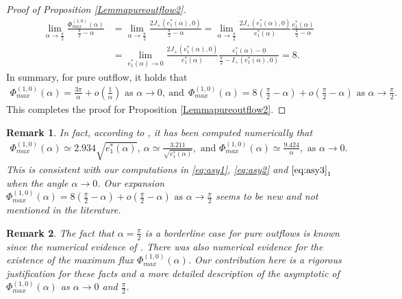 \documentclass[reqno,12pt]{amsart}
\newtheorem{remark}{Remark}[section]
\begin{document}
\begin{proof} [Proof of Proposition \ref{Lemmapureoutflow2}]
\begin{align*}
    \lim_{\alpha\to \frac{\pi}{2}} \frac{ \Phi_{max}^{(1, 0)}(\alpha)}{\frac{\pi}{2}-\alpha} &= \lim_{\alpha\to \frac{\pi}{2}}  \frac{2 J_{+}(e_1^*(\alpha), 0)}{\frac{\pi}{2}-\alpha} = \lim_{\alpha\to \frac{\pi}{2}}  \frac{2 J_{+}(e_1^*(\alpha),0)}{e_1^*(\alpha)}\frac{e_1^*(\alpha)}{\frac{\pi}{2}-\alpha}\\
    &=  \lim_{e_1^*(\alpha) \to 0}  \frac{2 J_{+}(e_1^*(\alpha),0)}{e_1^*(\alpha)}\frac{e_1^*(\alpha)-0}{\frac{\pi}{2}- I_{+}(e_1^*(\alpha),0)}=8.
\end{align*}
In summary,  for pure outflow, it holds that
\begin{equation}
\begin{aligned}\label{eq:asy3}
    \Phi_{max}^{(1, 0)}(\alpha) =\frac{3\pi}{\alpha} + o \left(\frac{1}{\alpha}\right)\mbox{ as } \alpha \to 0, \ \mbox{and}\ \    \Phi_{max}^{(1, 0)} (\alpha) = 8\left(\frac{\pi}{2}-\alpha\right)  + o \left(\frac{\pi}{2}-\alpha \right) \mbox{ as }  \alpha\to \frac{\pi}{2}.   
\end{aligned}
\end{equation} 
This completes the proof for Proposition \ref{Lemmapureoutflow2}. 
\end{proof}

\begin{remark}
    In fact, according to \cite{DrazinRiley}, it has been computed numerically that 
    \begin{align}\nonumber
 \Phi_{max}^{(1, 0)}(\alpha) \simeq 2.934 \sqrt{e_1^*(\alpha)}, ~
 \alpha \simeq \frac{3.211}{\sqrt{e_1^*(\alpha)}}, \textrm{ and } 
 \Phi_{max}^{(1, 0)}(\alpha) \simeq  \frac{9.424}{\alpha},  
  \textrm{ as } \alpha \to 0. 
    \end{align}
    This is consistent with our computations in \eqref{eq:asy1}, \eqref{eq:asy2} and ${\eqref{eq:asy3}}_1$ when the angle $\alpha\to0$. 
    Our expansion
    $\Phi_{max}^{(1, 0)} (\alpha) = 8\left(\frac{\pi}{2}-\alpha\right)  + o \left(\frac{\pi}{2}-\alpha \right) \mbox{ as }  \alpha\to \frac{\pi}{2}$ seems to be new and not mentioned in the literature.
\end{remark}

 


\begin{remark}
    The fact that  $\alpha=\frac{\pi}{2}$ is a borderline case for pure outflows is known since the numerical evidence of \cite{Rosenhead40}. There was also numerical evidence for the existence of the maximum flux $\Phi_{max}^{(1, 0)}(\alpha)$. 
    Our contribution here is a rigorous justification for these facts and a more detailed description of the asymptotic of $\Phi_{max}^{(1, 0)}(\alpha)$ as $\alpha\to 0$ and $\frac{\pi}{2}$.
\end{remark}
\end{document}
